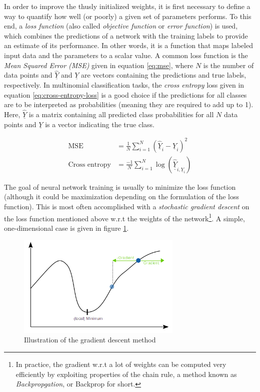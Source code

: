 \documentclass[11pt, a4paper]{article}
\newcommand\braces[1]{\left(#1\right)}
\renewcommand{\vec}[1]{\underline{#1}}
\newcommand{\mat}[1]{\underline{\underline{#1}}}
\begin{document}
In order to improve the thusly initialized weights, it is first necessary to define a way to quantify how well (or poorly) a given set of parameters performs. To this end, a \emph{loss function} (also called \emph{objective function} or \emph{error function}) is used, which combines the predictions of a network with the training labels to provide an estimate of its performance. In other words, it is a function that maps labeled input data and the parameters to a scalar value. A common loss function is the \emph{Mean Squared Error (MSE)} given in equation \eqref{eq:mse}, where $N$ is the number of data points and $\vec{\hat Y}$ and $\vec{Y}$ are vectors containing the predictions and true labels, respectively. In multinomial classification tasks, the \emph{cross entropy} loss given in equation \eqref{eq:cross-entropy-loss} \cite{caffe-cross-entropy} is a good choice if the predictions for all classes are to be interpreted as probabilities (meaning they are required to add up to 1). Here, $\vec{\hat Y}$ is a matrix containing all predicted class probabilities for all $N$ data points and $\vec{Y}$ is a vector indicating the true class.

\begin{align}
	\text{MSE} &= \frac{1}{N} \sum_{i=1}^N \braces{\vec{\hat Y}_i - \vec{Y}_i}^2 \label{eq:mse} \\
	\text{Cross entropy} &= \frac{-1}{N} \sum_{i=1}^N \log{\braces{\mat{\hat Y}_{i, \vec{Y}_i}}} \label{eq:cross-entropy-loss}
\end{align}

The goal of neural network training is usually to minimize the loss function (although it could be maximization depending on the formulation of the loss function). This is most often accomplished with a \emph{stochastic gradient descent} \cite{stochastic-gradient-descent-learning-neural-networks} on the loss function mentioned above w.r.t the weights of the network\footnote{In practice, the gradient w.r.t a lot of weights can be computed very efficiently by exploiting properties of the chain rule, a method known as \emph{Backpropgation}, or Backprop for short.}. A simple, one-dimensional case is given in figure \ref{fig:gradient-descent}.

\begin{figure}[h!tb]
	\centering
	\includegraphics[width=0.7\textwidth]{images/gradient_descent.png}
	\caption[Gradient descent method]{Illustration of the gradient descent method}
	\label{fig:gradient-descent}
\end{figure}
\end{document}
